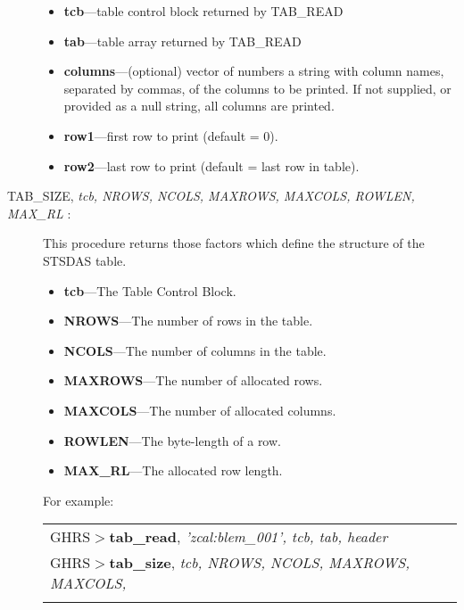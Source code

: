 \begin{description}
\begin{itemize}
\item	{\bf tcb}---table control block returned by TAB\_READ
\item	{\bf tab}---table array returned by TAB\_READ
\item	{\bf columns}---(optional) vector of numbers a string with
column names, separated by commas, of the columns to be printed. If
not supplied, or provided as a null string, all columns are printed. 
\item	{\bf row1}---first row to print  (default = 0).
\item	{\bf row2}---last row to print (default = last row in table).
\end{itemize} 
%
\item [TAB\_SIZE, {\it tcb, NROWS, NCOLS, MAXROWS, MAXCOLS, ROWLEN, 
MAX\_RL} : ] This procedure returns those factors which define the 
structure of the STSDAS table.

\begin{itemize}

\item {\bf tcb}---The Table Control Block.

\item {\bf NROWS}---The number of rows in the table.

\item {\bf NCOLS}---The number of columns in the table.

\item {\bf MAXROWS}---The 
number of allocated rows.

\item {\bf MAXCOLS}---The number of allocated columns.

\item {\bf ROWLEN}---The byte-length of a row.

\item {\bf MAX\_RL}---The allocated row length.

\end{itemize}

\noindent
For example:\\

\begin{small}
\begin{tabular}{ll}
GHRS$>${\bf tab\_read}, {\it 'zcal:blem\_001', tcb, tab, header} & \\
GHRS$>${\bf tab\_size}, {\it tcb, NROWS, NCOLS, MAXROWS, MAXCOLS,} & \\
\hspace{1.1in}{\it ROWLEN, MAX\_RL} & \\
\end{tabular}\\
\end{small}


\end{description}
